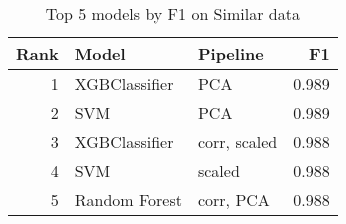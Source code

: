 \begin{table}[!htb]
\caption{Top 5 models by F1 on Similar data}
\label{table-top-5-f1-similar}
\centering
\begin{tabular}{rllr}
\toprule
Rank & Model & Pipeline & F1 \\
\midrule
1 & XGBClassifier & PCA & 0.989 \\
2 & SVM & PCA & 0.989 \\
3 & XGBClassifier & corr, scaled & 0.988 \\
4 & SVM & scaled & 0.988 \\
5 & Random Forest & corr, PCA & 0.988 \\
\bottomrule
\end{tabular}
\end{table}
